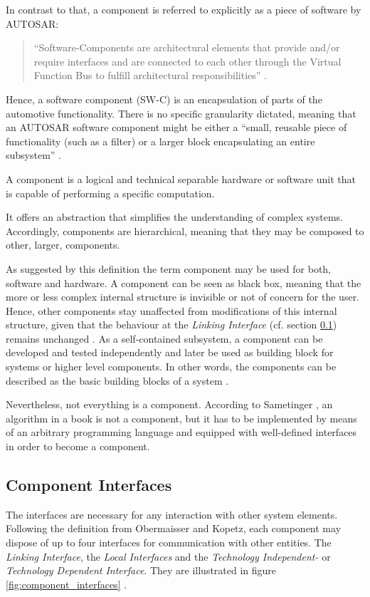 In contrast to that, a component is referred to explicitly as a piece of software by \mbox{AUTOSAR}:	
\begin{quote}
``Software-Components are architectural elements that provide and/or require interfaces and are connected to each other through the Virtual Function Bus to fulfill architectural responsibilities'' \cite{autosar_glossary}.
\end{quote}

Hence, a software component (SW-C) is an encapsulation of parts of the automotive functionality. There is no specific granularity dictated, meaning that an \mbox{AUTOSAR} software component might be either a ``small, reusable piece of functionality (such as a filter) or a larger block encapsulating an entire subsystem'' \cite{autosar}.

\begin{myquote}
A component is a logical and technical separable hardware or software unit that is capable of performing a specific computation.

It offers an abstraction that simplifies the understanding of complex systems. Accordingly, components are hierarchical, meaning that they may be composed to other, larger, components.
\end{myquote}

As suggested by this definition the term component may be used for both, software and hardware. A component can be seen as black box, meaning that the more or less complex internal structure is invisible or not of concern for the user. Hence, other components stay unaffected from modifications of this internal structure, given that the behaviour at the \emph{Linking Interface} (cf. section \ref{sec:component_interfaces}) remains unchanged \cite[p.38-39]{genesys} \cite{autosar_intro} \cite{sametinger}. As a self-contained subsystem, a component can be developed and tested independently and later be used as building block for systems or higher level components. In other words, the components can be described as the basic building blocks of a system \cite{ning}. 

Nevertheless, not everything is a component. According to Sametinger \cite[p.2-3]{sametinger}, an algorithm in a book is not a component, but it has to be implemented by means of an arbitrary programming language and equipped with well-defined interfaces in order to become a component.


\subsection{Component Interfaces}
\label{sec:component_interfaces}
The interfaces are necessary for any interaction with other system elements. Following the definition from Obermaisser and Kopetz, each component may dispose of up to four interfaces for communication with other entities. The \emph{Linking Interface}, the \emph{Local Interfaces} and the \emph{Technology Independent-} or \emph{Technology Dependent Interface}. They are illustrated in figure \ref{fig:component_interfaces} \cite[p.40-41]{genesys}.

